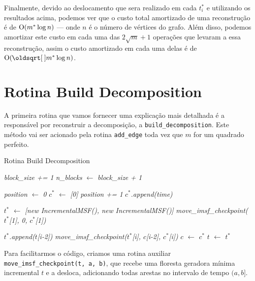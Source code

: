 Finalmente, devido ao deslocamento que sera realizado em cada $t_i^*$ e utilizando os resultados acima, podemos ver que o custo total amortizado de uma reconstrução é de $\mathrm{O}(m^* \log{n})$ --- onde $n$ é o número de vértices do grafo. Além disso, podemos amortizar este custo em cada uma das $2\sqrt{m} + 1$ operações que levaram a essa reconstrução, assim o custo amortizado em cada uma delas é de $\Oh(\sqrt{m^*} \log{n})$.

\section{Rotina Build Decomposition}
\label{sec:rmsf-build-decomposition}

A primeira rotina que vamos fornecer uma explicação mais detalhada é a responsável por reconstruir a decomposição, a \texttt{build\_decomposition}. Este método vai ser acionado pela rotina \texttt{add\_edge} toda vez que $m$ for um quadrado perfeito.


\begin{algorithm}[h!]
    \caption{Rotina Build Decomposition}\label{rmsf-build-decomp}
    \begin{algorithmic}[1]
        \State \emph{block\_size += 1}
        \State \emph{n\_blocks $\gets$ block\_size + 1}

        \State \emph{position $\gets$ 0}
        \State \emph{$c^*$ $\gets$ [0]}
        \State \emph{position += 1}
        \State \emph{$c^*$.append(time)}
        \EndIf
        \EndFor

        \State \emph{$t^*$ $\gets$ [new IncrementalMSF(), new IncrementalMSF()]}
        \State \emph{move\_imsf\_checkpoint($t^*$[1], 0, $c^*$[1])}

        \For{\emph{i $\in [2, n\_blocks)$}}
        \State \emph{$t^*$.append($t$[i-2])}
        \State \emph{move\_imsf\_checkpoint($t^*$[i], $c$[i-2], $c^*$[i])}
        \EndFor
        \State \emph{$c$ $\gets$ $c^*$}
        \State \emph{$t$ $\gets$ $t^*$}
        \EndFunction
    \end{algorithmic}
\end{algorithm}

Para facilitarmos o código, criamos uma rotina auxiliar \texttt{move\_imsf\_checkpoint(t, a, b)}, que recebe uma floresta geradora mínima incremental $t$ e a desloca, adicionando todas arestas no intervalo de tempo $(a, b]$.

